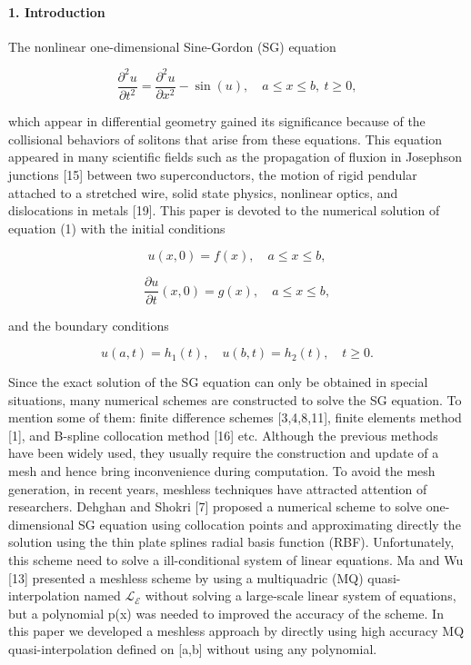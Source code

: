 \documentclass[12pt]{article}
\begin{document}
\hypertarget{introduction}{%
\paragraph{1. Introduction}\label{introduction}}

The nonlinear one-dimensional Sine-Gordon (SG) equation

\[\frac{\partial^2 u}{\partial t^2} = \frac{\partial^2 u}{\partial x^2} - \sin(u), \quad a \leqslant x \leqslant b, \ t \geqslant 0, \tag{1}\]

which appear in differential geometry gained its significance because of the collisional behaviors of solitons that arise from these equations.
This equation appeared in many scientific fields such as the propagation of fluxion in Josephson junctions {[}15{]} between two superconductors, the motion of rigid pendular attached to a stretched wire, solid state physics, nonlinear optics, and dislocations in metals {[}19{]}. This paper is devoted to the numerical solution of equation (1) with the initial conditions

\[u(x,0) = f(x), \quad a \le x \le b,\tag{2}\] 

\[\frac{\partial u}{\partial t}(x,0) = g(x), \quad a \leqslant x \leqslant b,\tag{3}\]

and the boundary conditions

\[u(a,t) = h_1(t), \quad u(b,t) = h_2(t), \quad t \geqslant 0.\tag{4}\]

Since the exact solution of the SG equation can only be obtained in special situations, many numerical schemes are constructed to solve the SG equation. To mention some of them: finite difference schemes {[}3,4,8,11{]}, finite elements method {[}1{]}, and B-spline collocation method {[}16{]} etc. Although the previous methods have been widely used, they usually require the construction and update of a mesh and hence bring inconvenience during computation. To avoid the mesh generation, in recent years, meshless techniques have attracted attention of researchers. Dehghan and Shokri {[}7{]} proposed a numerical scheme to solve one-dimensional SG equation using collocation points and approximating directly the solution using the thin plate splines radial basis function (RBF). Unfortunately, this scheme need to solve a ill-conditional system of linear equations. Ma and Wu {[}13{]} presented a meshless scheme by using a multiquadric (MQ) quasi-interpolation named \(\mathcal{L}_{\mathcal{E}}\) without solving a large-scale linear system of equations, but a polynomial p(x) was needed to improved the accuracy of the scheme. In this paper we developed a meshless approach by directly using high accuracy MQ quasi-interpolation defined on {[}a,b{]} without using any polynomial.
\end{document}
